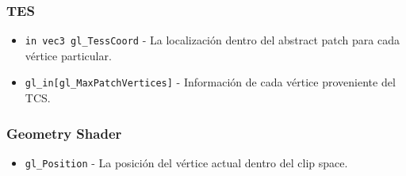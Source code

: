\subsubsection{TES}

\begin{itemize}
		\item \verb|in vec3 gl_TessCoord| - La localización dentro del abstract
				patch para cada vértice particular.
		\item \verb|gl_in[gl_MaxPatchVertices]| - Información de cada vértice
				proveniente del TCS.
\end{itemize}

\subsubsection{Geometry Shader}

\begin{itemize}
		\item \verb|gl_Position| - La posición del vértice actual dentro del
				clip space.
\end{itemize}
